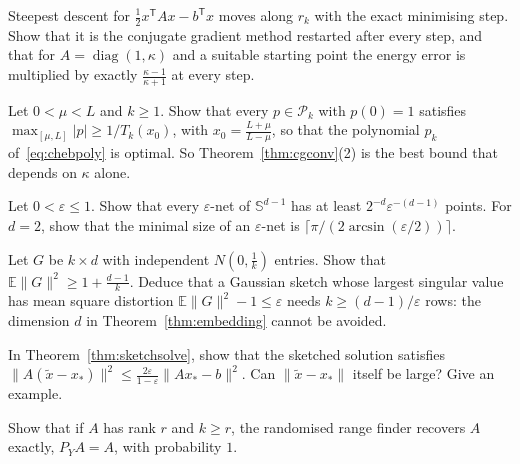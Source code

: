 \begin{exercise}[$\star\star$]\label{ex:steepest}
Steepest descent for $\frac12x^{\mathsf T}Ax-b^{\mathsf T}x$ moves along $r_k$ with the exact minimising step. Show that it is the conjugate gradient method restarted after every step, and
that for $A=\operatorname{diag}(1,\kappa)$ and a suitable starting point the energy error is multiplied by exactly $\frac{\kappa-1}{\kappa+1}$ at every step.
\end{exercise}

\begin{exercise}[$\star\star$]\label{ex:chebopt}
Let $0<\mu<L$ and $k\ge1$. Show that every $p\in\mathcal P_k$ with $p(0)=1$ satisfies $\max_{[\mu,L]}|p|\ge1/T_k(x_0)$, with $x_0=\frac{L+\mu}{L-\mu}$, so that the
polynomial $p_k$ of~\eqref{eq:chebpoly} is optimal. So Theorem~\ref{thm:cgconv}(2) is the best bound that depends on $\kappa$ alone.
\end{exercise}

\begin{exercise}[$\star$]\label{ex:netlower}
Let $0<\varepsilon\le1$. Show that every $\varepsilon$-net of $\mathbb S^{d-1}$ has at least $2^{-d}\varepsilon^{-(d-1)}$ points. For $d=2$, show that the minimal size of an
$\varepsilon$-net is $\lceil\pi/(2\arcsin(\varepsilon/2))\rceil$.
\end{exercise}

\begin{exercise}[$\star$]\label{ex:normlower}
Let $G$ be $k\times d$ with independent $N(0,\frac1k)$ entries. Show that $\mathbb E\|G\|^2\ge1+\frac{d-1}k$. Deduce that a Gaussian sketch whose largest singular value has
mean square distortion $\mathbb E\|G\|^2-1\le\varepsilon$ needs $k\ge(d-1)/\varepsilon$ rows: the dimension $d$ in Theorem~\ref{thm:embedding} cannot be avoided.
\end{exercise}

\begin{exercise}[$\star\star$]\label{ex:sketchsol}
In Theorem~\ref{thm:sketchsolve}, show that the sketched solution satisfies $\|A(\tilde x-x_*)\|^2\le\frac{2\varepsilon}{1-\varepsilon}\|Ax_*-b\|^2$. Can $\|\tilde x-x_*\|$ itself be large? Give an example.
\end{exercise}

\begin{exercise}[$\star$]\label{ex:exactlowrank}
Show that if $A$ has rank $r$ and $k\ge r$, the randomised range finder recovers $A$ exactly, $P_YA=A$, with probability $1$.
\end{exercise}

